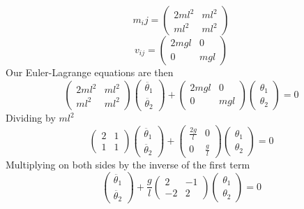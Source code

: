 \begin{equation}
m_ij = \left( \begin{array}{cc} 2ml^2 & ml^2 \\ ml^2 & ml^2 \end{array}\right)
\end{equation}
\begin{equation}
v_{ij} = \left(\begin{array}{cc} 2mgl & 0\\ 0 & mgl \end{array}\right)
\end{equation}
Our Euler-Lagrange equations are then
\begin{equation}
\left(\begin{array}{cc} 2ml^2 & ml^2 \\ ml^2 & ml^2 \end{array}\right) \left( \begin{array}{c} \ddot{\theta_1} \\ \ddot{\theta_2} \end{array}\right) + \left( \begin{array}{cc} 2mgl & 0 \\ 0 & mgl \end{array}\right) \left(\begin{array}{c} \theta_1 \\ \theta_2\end{array}\right) = 0
\end{equation}
Dividing by $ml^2$
\begin{equation}
\left(\begin{array}{cc} 2 & 1 \\ 1 & 1 \end{array}\right) \left( \begin{array}{c} \ddot{\theta_1} \\ \ddot{\theta_2} \end{array}\right) + \left( \begin{array}{cc} \frac{2g}{l} & 0 \\ 0 & \frac{g}{l} \end{array}\right) \left(\begin{array}{c} \theta_1 \\ \theta_2\end{array}\right) = 0
\end{equation}
Multiplying on both sides by the inverse of the first term
\begin{equation}
 \left( \begin{array}{c} \ddot{\theta_1} \\ \ddot{\theta_2} \end{array}\right) + \frac{g}{l}\left( \begin{array}{cc} 2 & -1 \\ -2 & 2 \end{array}\right) \left(\begin{array}{c} \theta_1 \\ \theta_2\end{array}\right) = 0
\end{equation}
